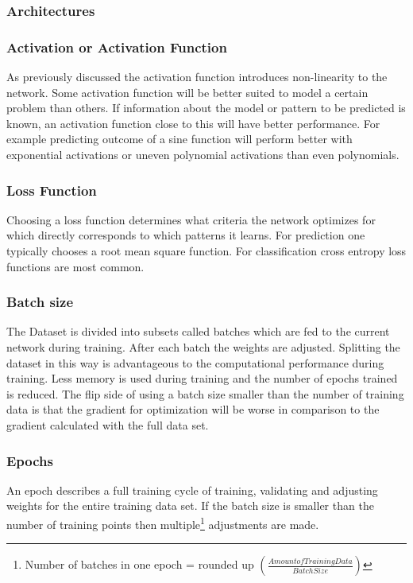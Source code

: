			\subsubsection{Architectures}
			\subsubsection{Activation or Activation Function}
				As previously discussed the activation function introduces non-linearity to the network. Some activation function will be better suited to model a certain problem than others. If information about the model or pattern to be predicted is known, an activation function close to this will have better performance. For example predicting outcome of a sine function will perform better with exponential activations or uneven polynomial activations than even polynomials.%
			\subsubsection{Loss Function}
				Choosing a loss function determines what criteria the network optimizes for which directly corresponds to which patterns it learns. For prediction one typically chooses a root mean square function. For classification cross entropy loss functions are most common.
			\subsubsection{Batch size}
				The Dataset is divided into subsets called batches which are fed to the current network during training. After each batch the weights are adjusted. Splitting the dataset in this way is advantageous to the computational performance during training. Less memory is used during training and the number of epochs trained is reduced. The flip side of using a batch size smaller than the number of training data is that the gradient for optimization will be worse in comparison to the gradient calculated with the full data set. 
			\subsubsection{Epochs}
				An epoch describes a full training cycle of training, validating and adjusting weights for the entire training data set. If the batch size is smaller than the number of training points then multiple\footnote{Number of batches in one epoch = rounded up $\left(\frac{Amount of Training Data}{Batch Size}\right)$} adjustments are made.%
